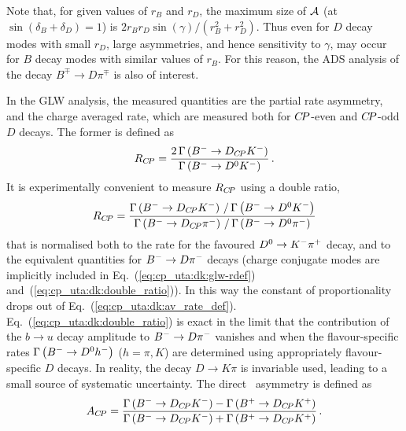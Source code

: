 Note that, for given values of $r_B$ and $r_D$, 
the maximum size of ${\cal A}$ (at $\sin \left( \delta_B + \delta_D \right) = 1$)
is $2 r_B r_D \sin \left( \gamma \right) / \left( r_B^2 + r_D^2 \right)$.
Thus even for $D$ decay modes with small $r_D$, 
large asymmetries, and hence sensitivity to $\gamma$, 
may occur for $B$ decay modes with similar values of $r_B$.
For this reason, the ADS analysis of the decay $B^\mp \to D \pi^\mp$ 
is also of interest.

In the GLW analysis, the measured quantities are the 
partial rate asymmetry, and the charge averaged rate,
which are measured both for $C\!P$-even and $C\!P$-odd $D$ decays.
The former is defined as 
\begin{equation}
  \label{eq:cp_uta:dk:glw-rdef}
  R_{C\!P} = 
  \frac{2 \, \Gamma \left( B^{-} \to D_{C\!P} K^-  \right)}
  {\Gamma\left( B^{-} \to D^0 K^- \right)} \, .
\end{equation}
It is experimentally convenient to measure $R_{C\!P}$ using a double ratio,
\begin{equation}
  \label{eq:cp_uta:dk:double_ratio}
  R_{C\!P} = 
  \frac{
    \Gamma\left( B^{-} \to D_{C\!P} K^-  \right) \, / \, \Gamma\left( B^{-} \to D^0 K^- \right)
  }{
    \Gamma\left( B^{-} \to D_{C\!P} \pi^- \right) \, / \, \Gamma\left( B^{-} \to D^0 \pi^- \right)
  }
\end{equation}
that is normalised both to the rate for the favoured $D^0 \to K^-\pi^+$ decay, 
and to the equivalent quantities for $B^{-} \to D\pi^-$ decays
(charge conjugate modes are implicitly included in 
Eq.~(\ref{eq:cp_uta:dk:glw-rdef}) and~(\ref{eq:cp_uta:dk:double_ratio})).
In this way the constant of proportionality drops out of 
Eq.~(\ref{eq:cp_uta:dk:av_rate_def}).
Eq.~(\ref{eq:cp_uta:dk:double_ratio}) is exact in the limit that the
contribution of the $b \to u$ decay amplitude to $B^{-} \to D \pi^-$ vanishes and
when the flavour-specific rates $\Gamma\left( B^{-} \to D^0 h^- \right)$ ($h =
\pi,K$) are determined using appropriately flavour-specific $D$ decays.
In reality, the decay $D \to K\pi$ is invariable used, leading to a small source of systematic uncertainty.
The direct \CP\ asymmetry is defined as
\begin{equation}
  \label{eq:cp_uta:dk:glw-adef}
  A_{C\!P} = \frac{
    \Gamma\left(B^{-}\to D_{C\!P}K^-\right) - \Gamma\left(B^{+}\to D_{C\!P}K^+\right)
  }{
    \Gamma\left(B^{-}\to D_{C\!P}K^-\right) + \Gamma\left(B^{+}\to D_{C\!P}K^+\right)
  } \, .
\end{equation}

